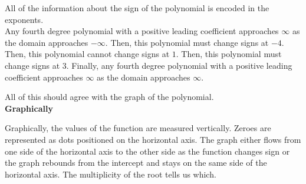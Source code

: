 \documentclass{ximera}
\begin{document}
\begin{example}
\begin{image}
  \end{image}




All of the information about the sign of the polynomial is encoded in the exponents. \\


Any fourth degree polynomial with a positive leading coefficient approaches $\infty$ as the domain approaches $-\infty$.  Then, this polynomial must change signs at $-4$. Then, this polynomial cannot change signs at $1$.  Then, this polynomial must change signs at $3$.  Finally, any fourth degree polynomial with a positive leading coefficient approaches $\infty$ as the domain approaches $\infty$.
 


\end{example}

All of this should agree with the graph of the polynomial. \\

























\textbf{\large Graphically}


Graphically, the values of the function are measured vertically. Zeroes are represented as dots positioned on the horizontal axis.  The graph either flows from one side of the horizontal axis to the other side as the function changes sign or the graph rebounds from the intercept and stays on the same side of the horizontal axis.  The multiplicity of the root tells us which.
\end{document}
